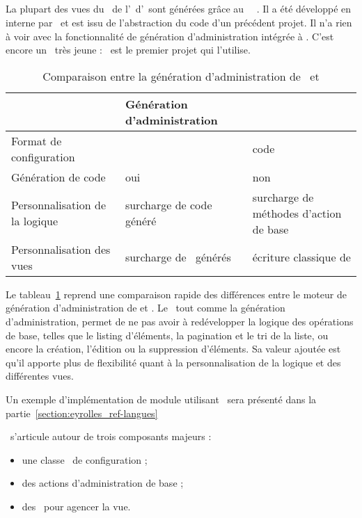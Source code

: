 \subsection{\asladmin}

La plupart des vues du \alotdeux\ de l'\aintranet\ d'\aey\ sont générées grâce au \aplugin\ \asf\ \asladmin. Il a été développé en interne par \asl\ et est issu de l'abstraction du code d'un précédent projet. Il n'a rien à voir avec la fonctionnalité de génération d'administration intégrée à \asf. C'est encore un \aplugin\ très jeune : \aey\ est le premier projet qui l'utilise.

\begin{table}
	\centering
	\begin{tabular}{|p{3cm}||p{4.5cm}|p{4.5cm}|}
		\hline
		& Génération d'administration & \asladmin\ \tabularnewline
		\hline
		\hline
		Format de configuration & \ayml & code \aphp \tabularnewline
		\hline
		Génération de code & oui & non \tabularnewline
		\hline
		Personnalisation de la logique & surcharge de code généré & surcharge de méthodes d'action de base \tabularnewline
		\hline
		Personnalisation des vues & surcharge de \apartials\ générés & écriture classique de \atemplates \tabularnewline
		\hline
	\end{tabular}
	\caption{Comparaison entre la génération d'administration de \asf\ et \asladmin}
	\label{table:eyrolles_sladmin_sladmin-vs-admin-gen}
\end{table}

Le tableau~\ref{table:eyrolles_sladmin_sladmin-vs-admin-gen} reprend une comparaison rapide des différences entre le moteur de génération d'administration de \asf et \asladmin. Le \aplugin\, tout comme la génération d'administration, permet de ne pas avoir à redévelopper la logique des opérations de base, telles que le listing d'éléments, la pagination et le tri de la liste, ou encore la création, l'édition ou la suppression d'éléments. Sa valeur ajoutée est qu'il apporte plus de flexibilité quant à la personnalisation de la logique et des différentes vues.

Un exemple d'implémentation de module utilisant \asladmin\ sera présenté dans la partie~\ref{section:eyrolles_ref-langues}

\asladmin\ s'articule autour de trois composants majeurs :
\begin{itemize}
	\item une classe \aphp\ de configuration ;
	\item des actions d'administration de base ;
	\item des \awidgets\ pour agencer la vue.
\end{itemize}


